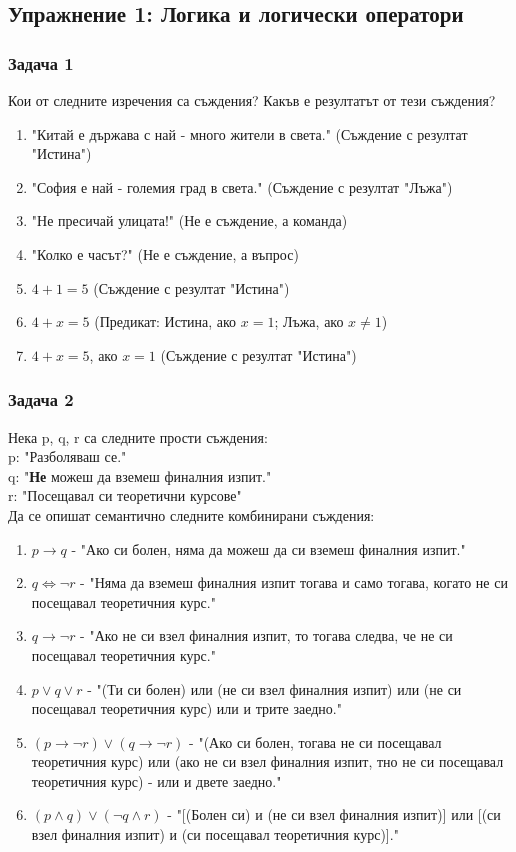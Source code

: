 \documentclass[fleqn, 12pt]{article}
\theoremstyle{definition}
\begin{document}
\subsection{Упражнение 1: Логика и логически оператори}

\subsubsection*{Задача 1}
Кои от следните изречения са съждения? Какъв е резултатът от тези съждения?
\begin{enumerate}
\item "Китай е държава с най - много жители в света." (Съждение с резултат "Истина")
\item "София е най - големия град в света." (Съждение с резултат "Лъжа")
\item "Не пресичай улицата!" (Не е съждение, а команда)
\item "Колко е часът?" (Не е съждение, а въпрос)
\item $4 + 1 = 5$ (Съждение с резултат "Истина")
\item $4 + x = 5$ (Предикат: Истина, ако $x = 1$; Лъжа, ако $x \neq 1$)
\item $4 + x = 5$, ако $x = 1$ (Съждение с резултат "Истина")
\end{enumerate}

\subsubsection*{Задача 2}
Нека p, q, r са следните прости съждения:\\
p: "Разболяваш се." \\
q: "\textbf{Не} можеш да вземеш финалния изпит." \\
r: "Посещавал си теоретични курсове" \\
Да се опишат семантично следните комбинирани съждения:
\begin{enumerate}
\item $p \to q$ - "Ако си болен, няма да можеш да си вземеш финалния изпит."
\item $q \Leftrightarrow \neg r$ - "Няма да вземеш финалния изпит тогава и само тогава, когато не си посещавал теоретичния курс."
\item $q \to \neg r$ - "Ако не си взел финалния изпит, то тогава следва, че не си посещавал теоретичния курс."
\item $p \lor q \lor r$ - "(Ти си болен) или (не си взел финалния изпит) или (не си посещавал теоретичния курс) или и трите заедно."
\item $(p \to \neg r) \lor (q \to \neg r)$ - "(Ако си болен, тогава не си посещавал теоретичния курс) или (ако не си взел финалния изпит, тно не си посещавал теоретичния курс) - или и двете заедно."
\item $(p \land q) \lor (\neg q \land r)$ - "[(Болен си) и (не си взел финалния изпит)] или [(си взел финалния изпит) и (си посещавал теоретичния курс)]."
\end{enumerate}
\end{document}
